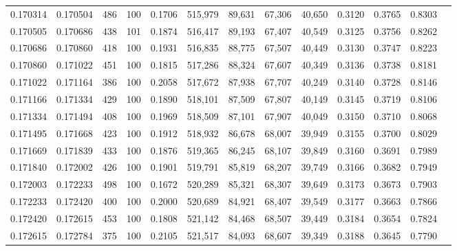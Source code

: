\begin{tabular}{rrrrrrrrrrrrr}
0.170314 & 0.170504 &   486 & 100 &                                     0.1706 & 515,979 &  89,631 &  67,306 &  40,650 & 0.3120 & 0.3765 & 0.8303 \\
0.170505 & 0.170686 &   438 & 101 &                                     0.1874 & 516,417 &  89,193 &  67,407 &  40,549 & 0.3125 & 0.3756 & 0.8262 \\
0.170686 & 0.170860 &   418 & 100 &                                     0.1931 & 516,835 &  88,775 &  67,507 &  40,449 & 0.3130 & 0.3747 & 0.8223 \\
0.170860 & 0.171022 &   451 & 100 &                                     0.1815 & 517,286 &  88,324 &  67,607 &  40,349 & 0.3136 & 0.3738 & 0.8181 \\
0.171022 & 0.171164 &   386 & 100 &                                     0.2058 & 517,672 &  87,938 &  67,707 &  40,249 & 0.3140 & 0.3728 & 0.8146 \\
0.171166 & 0.171334 &   429 & 100 &                                     0.1890 & 518,101 &  87,509 &  67,807 &  40,149 & 0.3145 & 0.3719 & 0.8106 \\
0.171334 & 0.171494 &   408 & 100 &                                     0.1969 & 518,509 &  87,101 &  67,907 &  40,049 & 0.3150 & 0.3710 & 0.8068 \\
0.171495 & 0.171668 &   423 & 100 &                                     0.1912 & 518,932 &  86,678 &  68,007 &  39,949 & 0.3155 & 0.3700 & 0.8029 \\
0.171669 & 0.171839 &   433 & 100 &                                     0.1876 & 519,365 &  86,245 &  68,107 &  39,849 & 0.3160 & 0.3691 & 0.7989 \\
0.171840 & 0.172002 &   426 & 100 &                                     0.1901 & 519,791 &  85,819 &  68,207 &  39,749 & 0.3166 & 0.3682 & 0.7949 \\
0.172003 & 0.172233 &   498 & 100 &                                     0.1672 & 520,289 &  85,321 &  68,307 &  39,649 & 0.3173 & 0.3673 & 0.7903 \\
0.172233 & 0.172420 &   400 & 100 &                                     0.2000 & 520,689 &  84,921 &  68,407 &  39,549 & 0.3177 & 0.3663 & 0.7866 \\
0.172420 & 0.172615 &   453 & 100 &                                     0.1808 & 521,142 &  84,468 &  68,507 &  39,449 & 0.3184 & 0.3654 & 0.7824 \\
0.172615 & 0.172784 &   375 & 100 &                                     0.2105 & 521,517 &  84,093 &  68,607 &  39,349 & 0.3188 & 0.3645 & 0.7790 \\

\end{tabular}
